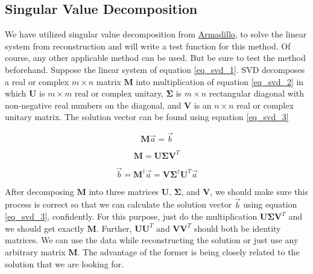 \documentclass{article}
\begin{document}
\subsection{Singular Value Decomposition}
We have utilized singular value decomposition from \href{http://arma.sourceforge.net}{Armadillo}, to solve the linear system from reconstruction and will write a test function for this method. Of course, any other applicable method can be used. But be sure to test the method beforehand. Suppose the linear system of equation \ref{eq_svd_1}. SVD decomposes a real or complex $m\times n$ matrix $\boldsymbol{M}$ into multiplication of equation \ref{eq_svd_2} in which $\boldsymbol{U}$ is $m\times m$ real or complex unitary, $\boldsymbol{\Sigma}$ is $m \times n$ rectangular diagonal with non-negative real numbers on the diagonal, and $\boldsymbol{V}$ is an $n \times n$ real or complex unitary matrix. The solution vector can be found using equation \ref{eq_svd_3}

\begin{equation}
\label{eq_svd_1}
\boldsymbol{M} \vec{a}=\vec{b}
\end{equation}

\begin{equation}
\label{eq_svd_2}
\boldsymbol{M}=\boldsymbol{U} \boldsymbol{\Sigma} \boldsymbol{V}^T
\end{equation}

\begin{equation}
\label{eq_svd_3}
\vec{b}=\boldsymbol{M}^{\dagger} \vec{a}=\boldsymbol{V} \boldsymbol{\Sigma}^{\dagger} \boldsymbol{U}^T \vec{a}
\end{equation}

After decomposing $\boldsymbol{M}$ into three matrices $\boldsymbol{U}$, $\boldsymbol{\Sigma}$, and $\boldsymbol{V}$, we should make sure this process is correct so that we can calculate the solution vector $\vec{b}$ using equation \ref{eq_svd_3}, confidently. For this purpose, just do the multiplication $\boldsymbol{U} \boldsymbol{\Sigma} \boldsymbol{V}^T$ and we should get exactly $\boldsymbol{M}$. Further, $\boldsymbol{U}\boldsymbol{U}^T$ and $\boldsymbol{V}\boldsymbol{V}^T$ should both be identity matrices. We can use the data while reconstructing the solution or just use any arbitrary matrix  $\boldsymbol{M}$. The advantage of the former is being closely related to the solution that we are looking for.
\end{document}
